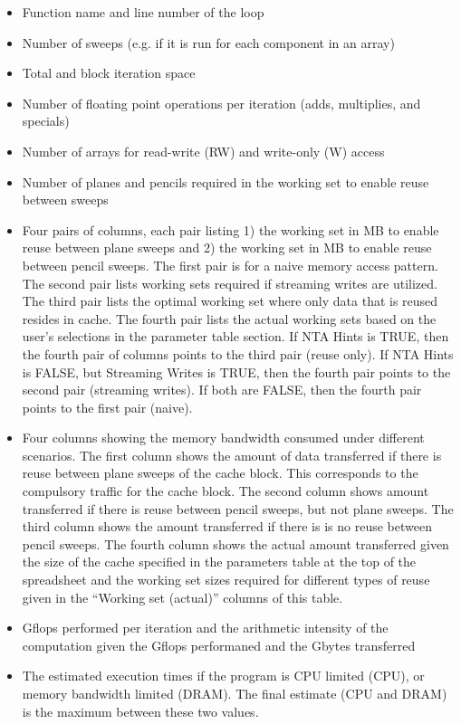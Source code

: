 \documentclass{article}
\begin{document}
\begin{itemize}

\item Function name and line number of the loop

\item Number of sweeps (e.g. if it is run for each component in an array)

\item Total and block iteration space

\item Number of floating point operations per iteration (adds, multiplies,
and specials)

\item Number of arrays for read-write (RW) and write-only (W) access

\item Number of planes and pencils required in the working set to enable
reuse between sweeps

\item Four pairs of columns, each pair listing 1) the working set in MB
      to enable reuse between plane sweeps and 2) the working set in MB
      to enable reuse between pencil sweeps.  The first pair is for a
      naive memory access pattern.  The second pair lists working sets
      required if streaming writes are utilized.  The third pair lists
      the optimal working set where only data that is reused resides
      in cache.  The fourth pair lists the actual working sets based on
      the user's selections in the parameter table section.  If NTA Hints
      is TRUE, then the fourth pair of columns points to the third pair
      (reuse only).  If NTA Hints is FALSE, but Streaming Writes is TRUE,
      then the fourth pair points to the second pair (streaming writes).
      If both are FALSE, then the fourth pair points to the first pair
      (naive).

\item Four columns showing the memory bandwidth consumed under different
      scenarios.  The first column shows the amount of data transferred
      if there is reuse between plane sweeps of the cache block.
      This corresponds to the compulsory traffic for the cache block.
      The second column shows amount transferred if there is reuse between
      pencil sweeps, but not plane sweeps.  The third column shows the
      amount transferred if there is is no reuse between pencil sweeps.
      The fourth column shows the actual amount transferred given the
      size of the cache specified in the parameters table at the top of
      the spreadsheet and the working set sizes required for different
      types of reuse given in the ``Working set (actual)'' columns of
      this table.

\item Gflops performed per iteration and the arithmetic intensity of
      the computation given the Gflops performaned and the Gbytes
      transferred

\item The estimated execution times if the program is CPU limited (CPU),
      or memory bandwidth limited (DRAM).  The final estimate (CPU and
      DRAM) is the maximum between these two values.

\end{itemize}
\end{document}

